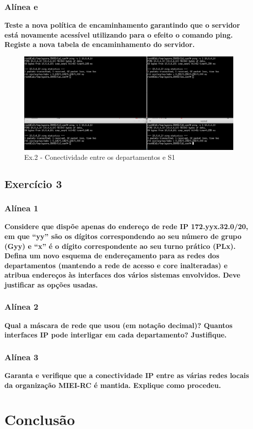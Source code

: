 \documentclass[a4paper]{report}
\begin{document}
\subsection{Alínea e}
\textbf{Teste a nova política de encaminhamento garantindo que o servidor está novamente
acessível utilizando para o efeito o comando ping. Registe a nova tabela de
encaminhamento do servidor.}

\begin{figure}[H]
    \centering 
    \includegraphics[width=\textwidth]{images/conectividadeDep.png}
    \caption{Ex.2 - Conectividade entre os departamentos e S1}
    \label{fig:conectividadeDep}
\end{figure}

\section{Exercício 3}

\subsection{Alínea 1}
\textbf{Considere que dispõe apenas do endereço de rede IP 172.yyx.32.0/20, em que “yy”
são os dígitos correspondendo ao seu número de grupo (Gyy) e “x” é o dígito 
correspondente ao seu turno prático (PLx). Defina um novo esquema de endereçamento para 
as redes dos departamentos (mantendo a rede de acesso e core inalteradas) e atribua 
endereços às interfaces dos vários sistemas envolvidos. Deve justificar as opções usadas.}

\subsection{Alínea 2}
\textbf{Qual a máscara de rede que usou (em notação decimal)? Quantos interfaces IP pode 
interligar em cada departamento? Justifique.}

\subsection{Alínea 3}
\textbf{Garanta e verifique que a conectividade IP entre as várias redes locais da 
organização MIEI-RC é mantida. Explique como procedeu.}

\chapter{Conclusão}
\end{document}
